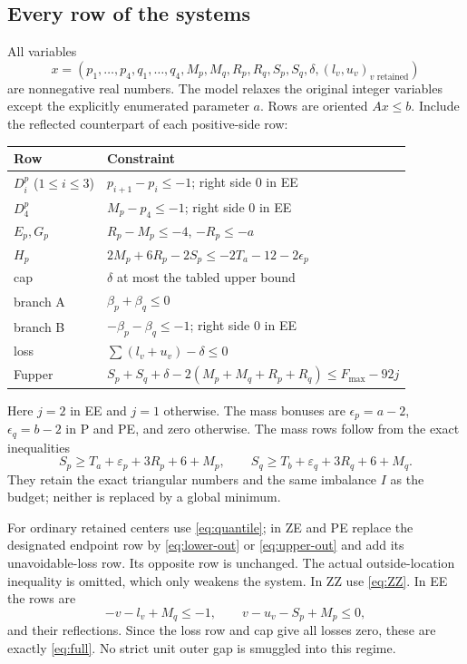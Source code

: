 \documentclass[11pt,a4paper]{article}
\begin{document}
\subsection{Every row of the systems}
All variables
\[
 x=(p_1,\ldots,p_4,q_1,\ldots,q_4,M_p,M_q,R_p,R_q,S_p,S_q,
       \delta,(l_v,u_v)_{v\text{ retained}})
\]
are nonnegative real numbers. The model relaxes the original integer
variables except the explicitly enumerated parameter $a$.
Rows are oriented $Ax\le b$. Include the reflected counterpart of each
positive-side row:
\begin{center}\small
\begin{tabular}{ll}
\toprule
Row&Constraint\\
\midrule
$D_i^p$ ($1\le i\le3$)&$p_{i+1}-p_i\le-1$; right side 0 in EE\\
$D_4^p$&$M_p-p_4\le-1$; right side 0 in EE\\
$E_p,G_p$&$R_p-M_p\le-4$, $-R_p\le-a$\\
$H_p$&$2M_p+6R_p-2S_p\le-2T_a-12-2\epsilon_p$\\
cap&$\delta$ at most the tabled upper bound\\
branch A&$\beta_p+\beta_q\le0$\\
branch B&$-\beta_p-\beta_q\le-1$; right side 0 in EE\\
loss&$\sum(l_v+u_v)-\delta\le0$\\
Fupper&$S_p+S_q+\delta-2(M_p+M_q+R_p+R_q)\le F_{\max}-92j$\\
\bottomrule
\end{tabular}
\end{center}
Here $j=2$ in EE and $j=1$ otherwise. The mass bonuses are
$\epsilon_p=a-2$, $\epsilon_q=b-2$ in P and PE, and zero otherwise.
The mass rows follow from the exact inequalities
\[
 S_p\ge T_a+\varepsilon_p+3R_p+6+M_p,\qquad
 S_q\ge T_b+\varepsilon_q+3R_q+6+M_q.
\]
They retain the exact triangular numbers and the same imbalance $I$ as
the budget; neither is replaced by a global minimum.

For ordinary retained centers use \eqref{eq:quantile}; in ZE and PE
replace the designated endpoint row by \eqref{eq:lower-out} or
\eqref{eq:upper-out} and add its unavoidable-loss row. Its opposite row
is unchanged. The actual outside-location inequality is omitted, which
only weakens the system. In ZZ use \eqref{eq:ZZ}.
In EE the rows are
\[
 -v-l_v+M_q\le-1,\qquad v-u_v-S_p+M_p\le0,
\]
and their reflections. Since the loss row and cap give all losses zero,
these are exactly \eqref{eq:full}. No strict unit outer gap is smuggled
into this regime.
\end{document}

